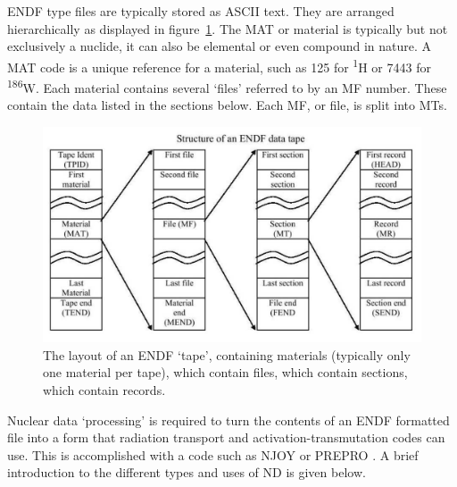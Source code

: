 ENDF type files are typically stored as ASCII  text. They are arranged hierarchically as displayed in figure~\ref{fig:endf}. The MAT or material is typically but not exclusively a nuclide, it can also be elemental or even compound in nature. A MAT code is a unique reference for a material, such as 125 for \textsuperscript{1}H or 7443 for \textsuperscript{186}W. Each material contains several `files' referred to by an MF number. These contain the data listed in the sections below. Each MF, or file, is split into MTs. 

\begin{figure}[ht]
  \includegraphics[width=\textwidth]{endf_architecture}
  \caption{The layout of an ENDF `tape', containing materials (typically only one material per tape), which contain files, which contain sections, which contain records.}
  \label{fig:endf}
\end{figure}

Nuclear data `processing' is required to turn the contents of an ENDF formatted file into a form that radiation transport and activation-transmutation codes can use. This is accomplished with a code such as NJOY \cite{MacFarlane2010} or PREPRO \cite{cullen2017}. A brief introduction to the different types and uses of ND is given below.

